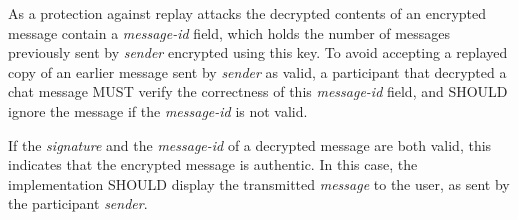 \documentclass{article}
\def\field#1{\textit{#1}}
\begin{document}
As a protection against replay attacks the decrypted contents of an encrypted message contain a \field{message-id} field, which holds the number of messages previously sent by \field{sender} encrypted using this key.
To avoid accepting a replayed copy of an earlier message sent by \field{sender} as valid, a participant that decrypted a chat message MUST verify the correctness of this \field{message-id} field, and SHOULD ignore the message if the \field{message-id} is not valid.

If the \field{signature} and the \field{message-id} of a decrypted message are both valid, this indicates that the encrypted message is authentic.
In this case, the implementation SHOULD display the transmitted \field{message} to the user, as sent by the participant \field{sender}.





\end{document}
